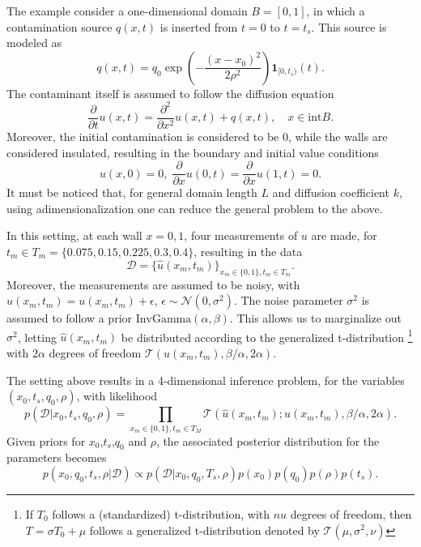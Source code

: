 The example consider a one-dimensional domain $B = [0,1]$, in which a contamination source $q(x,t)$ is inserted from $t=0$ to $t=t_s$. This source is modeled as
\begin{equation}
q(x,t) = q_0 \exp \left(-\frac{(x-x_0)^2}{2 \rho^2} \right) \mathbf{1}_{[0,t_s)}(t).
\end{equation}
The contaminant itself is assumed to follow the diffusion equation 
\begin{equation}
\frac{\partial}{\partial t} u(x,t) = \frac{\partial^2}{\partial x^2} u(x,t) + q(x,t), \quad x \in \text{int} B.
\end{equation}
Moreover, the initial contamination is considered to be $0$, while the walls are considered insulated, resulting in the boundary and initial value conditions
\begin{equation}
u(x,0) = 0, \; \frac{\partial}{\partial x} u(0,t) = \frac{\partial}{\partial x} u(1,t) = 0.
\end{equation}
It must be noticed that, for general domain length $L$ and diffusion coefficient $k$, using adimensionalization one can reduce the general problem to the above.

In this setting, at each wall $x=0,1$, four measurements of $u$ are made, for $t_m \in T_m = \{0.075,0.15,0.225,0.3,0.4\}$, resulting in the data 
\begin{displaymath}
 \mathcal{D} = \{\hat{u}(x_m,t_m)\}_{x_m \in \{0,1\},t_m \in T_m}.
\end{displaymath}
Moreover, the measurements are assumed to be noisy, with $\hat{u}(x_m,t_m) = u(x_m,t_m) + \epsilon$, $\epsilon \sim \mathcal{N}(0,\sigma^2)$. The noise parameter $\sigma^2$ is assumed to follow a prior $\text{InvGamma}(\alpha,\beta)$. This allows us to marginalize out $\sigma^2$, letting $\hat{u}(x_m,t_m)$ be distributed according to the generalized t-distribution \footnote{If $T_0$ follows a (standardized) t-distribution, with $nu$ degrees of freedom, then $T = \sigma T_0 + \mu$ follows a generalized t-distribution denoted by $\mathcal{T}(\mu,\sigma^2,\nu)$} with $2\alpha$ degrees of freedom $\mathcal{T}(u(x_m,t_m),\beta/\alpha,2 \alpha)$. 

The setting above results in a 4-dimensional inference problem, for the variables $(x_0,t_s,q_0,\rho)$, with likelihood
\begin{equation}
 p(\mathcal{D}|x_0,t_s,q_0,\rho) = \prod_{x_m \in \{0,1\},t_m \in T_M} \mathcal{T}(\hat{u}(x_m,t_m);u(x_m,t_m),\beta/\alpha,2 \alpha).
\end{equation}
Given priors for $x_0$,$t_s$,$q_0$ and $\rho$, the associated posterior distribution for the parameters becomes 
\begin{equation}\label{posteriorsource}
p(x_0,q_0,t_s,\rho|\mathcal{D}) \propto p(\mathcal{D}|x_0,q_0,T_s,\rho) p(x_0)p(q_0)p(\rho)p(t_s).
\end{equation}

